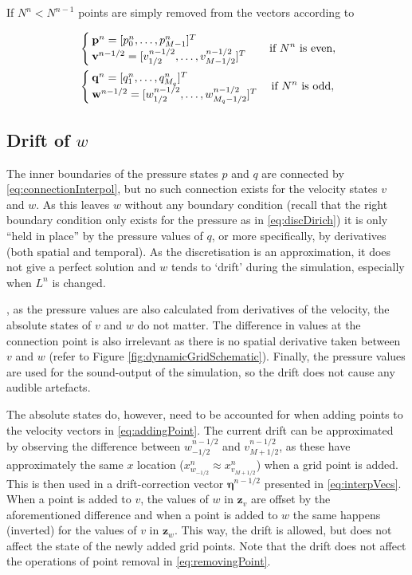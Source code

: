 If $N^n < N^{n-1}$ points are simply removed from the vectors according to

\begin{equation}\label{eq:removingPoint}
    \begin{aligned}
        &\begin{cases}
            \mathbf{p}^n = [p_0^n, \hdots, p_{M-1}^n]^T\\
            \mathbf{v}^{n-1/2} = [v_{1/2}^{n-1/2}, \hdots, v_{M-1/2}^{n-1/2}]^T
        \end{cases}
        \quad\!\text{if $N^n $ is even},\\
        &\begin{cases}
            \mathbf{q}^n = [q_1^n, \hdots, q_{M_q}^n]^T\\
            \mathbf{w}^{n-1/2} = [w_{1/2}^{n-1/2},\hdots, w_{M_q-1/2}^{n-1/2}]^T
        \end{cases}\text{if $ N^n$ is odd},
    \end{aligned}
\end{equation}

\subsection{Drift of $w$}\label{sec:drift}
The inner boundaries of the pressure states $p$ and $q$ are connected by \eqref{eq:connectionInterpol}, but no such connection exists for the velocity states $v$ and $w$. As this leaves $w$ without any boundary condition (recall that the right boundary condition only exists for the pressure as in \eqref{eq:discDirich}) it is only ``held in place'' by the pressure values of $q$, or more specifically, by derivatives (both spatial and temporal). As the discretisation is an approximation, it does not give a perfect solution and $w$ tends to `drift' during the simulation, especially when $L^n$ is changed.

\SWcomment[Luckily], as the pressure values are also calculated from derivatives of the velocity, the absolute states of $v$ and $w$ do not matter. The difference in values at the connection point is also irrelevant as there is no spatial derivative taken between $v$ and $w$ (refer to Figure \ref{fig:dynamicGridSchematic}). Finally, the pressure values are used for the sound-output of the simulation, so the drift does not cause any audible artefacts. 

The absolute states do, however, need to be accounted for when adding points to the velocity vectors in \eqref{eq:addingPoint}. The current drift can be approximated by observing the difference between $w_{-1/2}^{n-1/2}$ and $v_{M+1/2}^{n-1/2}$, as these have approximately the same $x$ location ($x_{w_{-1/2}}^n \approx x_{v_{M+1/2}}^n$) when a grid point is added. This is then used in a drift-correction vector $\boldsymbol{\eta}^{n-1/2}$ presented in \eqref{eq:interpVecs}. When a point is added to $v$, the values of $w$ in $\mathbf{z}_{v}$ are offset by the aforementioned difference and when a point is added to $w$ the same happens (inverted) for the values of $v$ in $\mathbf{z}_w$. This way, the drift is allowed, but does not affect the state of the newly added grid points. Note that the drift does not affect the operations of point removal in \eqref{eq:removingPoint}.

